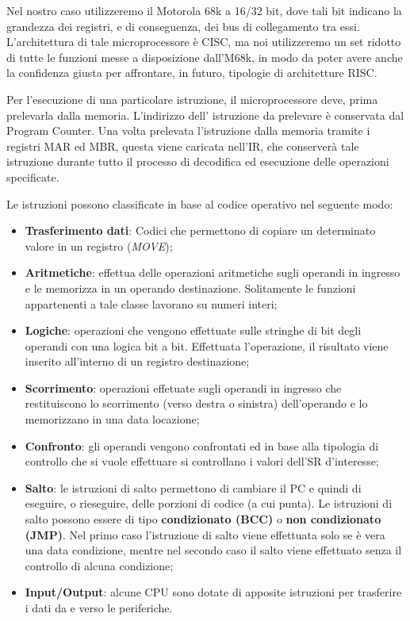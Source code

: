 Nel nostro caso utilizzeremo il Motorola 68k a 16/32 bit, dove tali bit indicano la grandezza dei registri, e di conseguenza, dei bus di collegamento tra essi. L'architettura di tale microprocessore è CISC, ma noi utilizzeremo un set ridotto di tutte le funzioni messe a disposizione dall'M68k, in modo da poter avere anche la confidenza giusta per affrontare, in futuro, tipologie di architetture RISC.

Per l'esecuzione di una particolare istruzione, il microprocessore deve, prima prelevarla dalla memoria. L'indirizzo dell' istruzione da prelevare è conservata dal Program Counter. Una volta prelevata l'istruzione dalla memoria tramite i registri MAR ed MBR, questa viene caricata nell'IR, che conserverà tale istruzione durante tutto il processo di decodifica ed esecuzione delle operazioni specificate.

\vspace{1em}
Le istruzioni possono classificate in base al codice operativo nel seguente modo:

\begin{itemize}
    \item \textbf{Trasferimento dati}: Codici che permettono di copiare un determinato valore in un registro (\textit{MOVE});

    \item \textbf{Aritmetiche}: effettua delle operazioni aritmetiche sugli operandi in ingresso e le memorizza in un operando destinazione. Solitamente le funzioni appartenenti a tale classe lavorano su numeri interi;

    \item \textbf{Logiche}: operazioni che vengono effettuate sulle stringhe di bit degli operandi con una logica bit a bit. Effettuata l'operazione, il risultato viene inserito all'interno di un registro destinazione;

    \item \textbf{Scorrimento}: operazioni effetuate sugli operandi in ingresso che restituiscono lo scorrimento (verso destra o sinistra) dell'operando e lo memorizzano in una data locazione;

    \item \textbf{Confronto}: gli operandi vengono confrontati ed in base alla tipologia di controllo che si vuole effettuare si controllano i valori dell'SR d'interesse;

    \item \textbf{Salto}: le istruzioni di salto permettono di cambiare il PC e quindi di eseguire, o rieseguire, delle porzioni di codice (a cui punta). Le istruzioni di salto possono essere di tipo \textbf{condizionato (BCC)} o \textbf{non condizionato (JMP)}. Nel primo caso l'istruzione di salto viene effettuata solo se è vera una data condizione, mentre nel secondo caso il salto viene effettuato senza il controllo di alcuna condizione;

    \item \textbf{Input/Output}: alcune CPU sono dotate di apposite istruzioni per trasferire i dati da e verso le periferiche.
\end{itemize}
